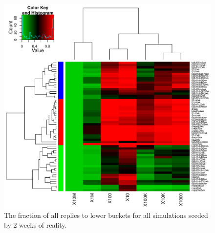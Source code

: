 \documentclass[10pt,oneside]{memoir}
\begin{document}
\begin{Spacing}{2}
\begin{figure}
\begin{center}
    \includegraphics{figures/crop/heatmap-b2br-aftr-rel-medians-2wk}
    \caption{The fraction of all replies to lower buckets for all simulations seeded by 2 weeks of reality.}
    \label{figure:heatmap-b2br-aftr-rel-medians-2wk}
\end{center}
\end{figure}


\end{Spacing}
\end{document}
